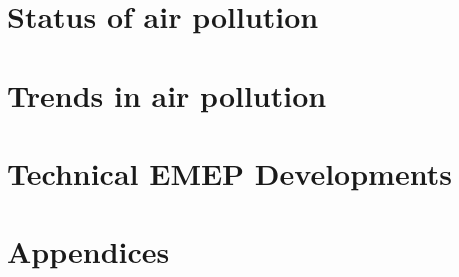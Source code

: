 \documentclass[a4paper,12pt,american,draft]{book}
\begin{document}
\frontmatter 
\pagestyle{fancy}


\cleardoublepage


\tableofcontents
\cleardoublepage

\mainmatter
\pagestyle{fancy}



\part{Status of air pollution}
 
 

\part{Trends in air pollution} 


\part{Technical EMEP Developments}



\part{Appendices}
\setcounter{part}{1}
\cleardoublepage
\setcounter{page}{1}
\begin{appendix}
\renewcommand{\theHchapter}{\Alph{chapter}}
\renewcommand{\thepage}{{\em page \Alph{chapter}:\arabic{page}}}
\renewcommand{\thepage}{{\Alph{chapter}:\arabic{page}}}
\renewcommand{\thetable}{\Alph{chapter}:\arabic{table}}








\end{appendix}
\end{document}

